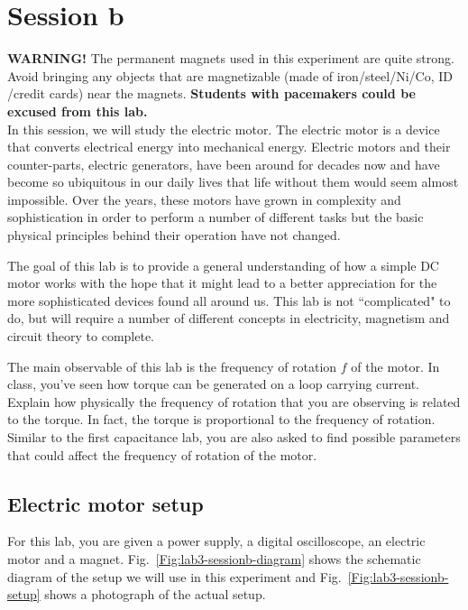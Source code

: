 \documentclass[12pt]{report}
\begin{document}
\section{Session b}
\Large{\textbf{WARNING!}} \normalsize The permanent magnets used in this experiment are quite strong. Avoid bringing any objects that are magnetizable (made of iron/steel/Ni/Co, ID /credit cards)  near the magnets. \textbf{Students with pacemakers could be excused from this lab.} \\

In this session, we will study the electric motor. The electric motor is a device that converts electrical energy into mechanical energy. Electric motors and their counter-parts, electric generators, have been around for decades now and have become so ubiquitous in our daily lives that life without them would seem almost impossible. Over the years, these motors have grown in complexity and sophistication in order to perform a number of different tasks but the basic physical principles behind their operation have not changed.

The goal of this lab is to provide a general understanding of how a simple DC motor works with the hope that it might lead to a better appreciation for the more sophisticated devices found all around us. This lab is not ``complicated" to do, but will require a number of different concepts in electricity, magnetism and circuit theory to complete.

The main observable of this lab is the frequency of rotation $f$ of the motor.
In class, you've seen how torque can be generated on a loop carrying current. {\color{blue} Explain how physically the frequency of rotation that you are observing is related to the torque.} In fact, the torque is proportional to the frequency of rotation.
Similar to the first capacitance lab, you are also asked to find possible parameters that could affect the frequency of rotation of the motor.

\subsection{Electric motor setup}
For this lab, you are given a power supply, a digital oscilloscope, an electric motor and a magnet. 
Fig.~\ref{Fig:lab3-sessionb-diagram} shows the schematic diagram of the setup we will use in this experiment and Fig.~\ref{Fig:lab3-sessionb-setup} shows a photograph of the actual setup. 
\end{document}
